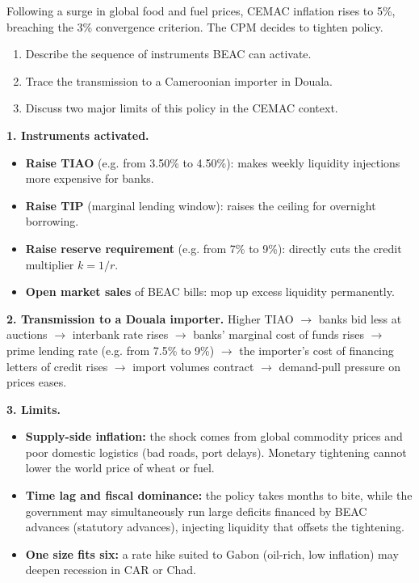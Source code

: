 \documentclass[11pt]{article}
\begin{document}
\begin{exoresolu}
Following a surge in global food and fuel prices, CEMAC inflation rises to 5\%, breaching the 3\% convergence criterion. The CPM decides to tighten policy.
\begin{enumerate}
\item Describe the sequence of instruments BEAC can activate.
\item Trace the transmission to a Cameroonian importer in Douala.
\item Discuss two major limits of this policy in the CEMAC context.
\end{enumerate}
\tcblower
\textbf{1. Instruments activated.}
\begin{itemize}
\item \textbf{Raise TIAO} (e.g. from 3.50\% to 4.50\%): makes weekly liquidity injections more expensive for banks.
\item \textbf{Raise TIP} (marginal lending window): raises the ceiling for overnight borrowing.
\item \textbf{Raise reserve requirement} (e.g. from 7\% to 9\%): directly cuts the credit multiplier $k = 1/r$.
\item \textbf{Open market sales} of BEAC bills: mop up excess liquidity permanently.
\end{itemize}

\textbf{2. Transmission to a Douala importer.}
Higher TIAO $\rightarrow$ banks bid less at auctions $\rightarrow$ interbank rate rises $\rightarrow$ banks' marginal cost of funds rises $\rightarrow$ prime lending rate (e.g. from 7.5\% to 9\%) $\rightarrow$ the importer's cost of financing letters of credit rises $\rightarrow$ import volumes contract $\rightarrow$ demand-pull pressure on prices eases.

\textbf{3. Limits.}
\begin{itemize}
\item \textbf{Supply-side inflation:} the shock comes from global commodity prices and poor domestic logistics (bad roads, port delays). Monetary tightening cannot lower the world price of wheat or fuel.
\item \textbf{Time lag and fiscal dominance:} the policy takes months to bite, while the government may simultaneously run large deficits financed by BEAC advances (statutory advances), injecting liquidity that offsets the tightening.
\item \textbf{One size fits six:} a rate hike suited to Gabon (oil-rich, low inflation) may deepen recession in CAR or Chad.
\end{itemize}
\end{exoresolu}
\end{document}
